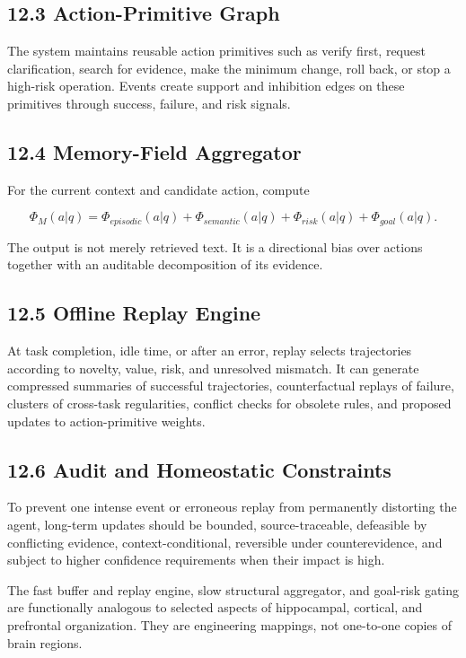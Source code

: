 \documentclass[11pt, a4paper]{article}
\begin{document}
\subsection{12.3 Action-Primitive Graph}

The system maintains reusable action primitives such as verify first, request clarification, search for evidence, make the minimum change, roll back, or stop a high-risk operation. Events create support and inhibition edges on these primitives through success, failure, and risk signals.

\subsection{12.4 Memory-Field Aggregator}

For the current context and candidate action, compute

\[
\Phi_M(a|q)=\Phi_{episodic}(a|q)+\Phi_{semantic}(a|q)+\Phi_{risk}(a|q)+\Phi_{goal}(a|q).
\]

The output is not merely retrieved text. It is a directional bias over actions together with an auditable decomposition of its evidence.

\subsection{12.5 Offline Replay Engine}

At task completion, idle time, or after an error, replay selects trajectories according to novelty, value, risk, and unresolved mismatch. It can generate compressed summaries of successful trajectories, counterfactual replays of failure, clusters of cross-task regularities, conflict checks for obsolete rules, and proposed updates to action-primitive weights.

\subsection{12.6 Audit and Homeostatic Constraints}

To prevent one intense event or erroneous replay from permanently distorting the agent, long-term updates should be bounded, source-traceable, defeasible by conflicting evidence, context-conditional, reversible under counterevidence, and subject to higher confidence requirements when their impact is high.

The fast buffer and replay engine, slow structural aggregator, and goal-risk gating are functionally analogous to selected aspects of hippocampal, cortical, and prefrontal organization. They are engineering mappings, not one-to-one copies of brain regions.
\end{document}
